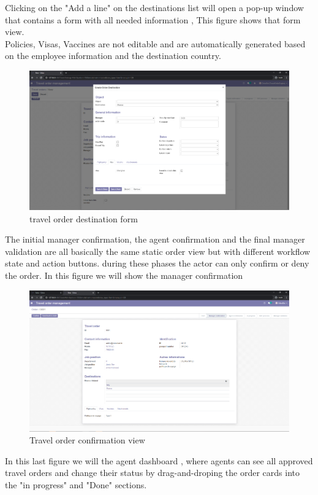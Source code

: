 Clicking on the "Add a line" on the destinations list will open a pop-up window that contains a form with all needed information , This figure shows that form view.\\
Policies, Visas, Vaccines are not editable and are automatically generated based on the employee information and the destination country.
\begin{figure}[H]
    \centering
    \includegraphics[scale=0.33]{img/c_destination_form.png}
    \caption{travel order destination form}
    \label{fig:my_label}
\end{figure}
The initial manager confirmation, the agent confirmation and the final manager validation are all basically the same static order view but with different workflow state and action buttons. during these phases the actor can only confirm or deny the order. In this figure we will show the manager confirmation
\begin{figure}[H]
    \centering
    \includegraphics[scale=0.33]{img/c_manager_confirmation.png}
    \caption{Travel order confirmation view}
    \label{fig:my_label}
\end{figure}
In this last figure we will the agent dashboard , where agents can see all approved travel orders and change their status by drag-and-droping the order cards into the "in progress" and "Done" sections.

